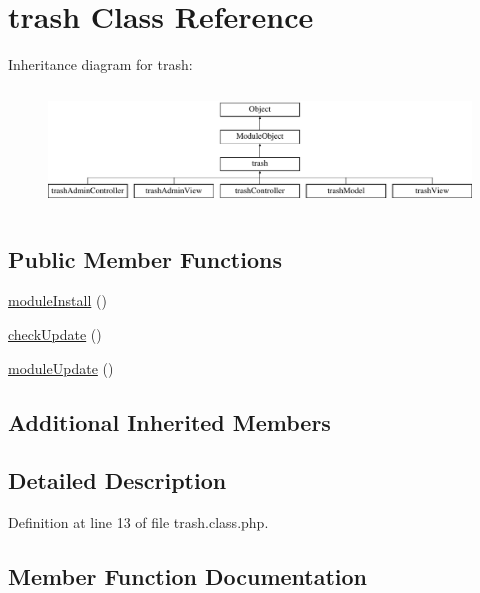 \hypertarget{classtrash}{}\section{trash Class Reference}
\label{classtrash}
Inheritance diagram for trash\+:\begin{figure}[H]
\begin{center}
\leavevmode
\includegraphics[height=3.223022cm]{classtrash}
\end{center}
\end{figure}
\subsection*{Public Member Functions}
\begin{DoxyCompactItemize}
\item 
\hyperlink{classtrash_aab8bc21b844b643ba68aa2c0ef6fcc10}{module\+Install} ()
\item 
\hyperlink{classtrash_afd6b11671a875ff9802a93d435963e77}{check\+Update} ()
\item 
\hyperlink{classtrash_a895b71f0ed15178c9aa04f2d0738aa31}{module\+Update} ()
\end{DoxyCompactItemize}
\subsection*{Additional Inherited Members}


\subsection{Detailed Description}


Definition at line 13 of file trash.\+class.\+php.



\subsection{Member Function Documentation}
\mbox{\label{classtrash_afd6b11671a875ff9802a93d435963e77}} 

